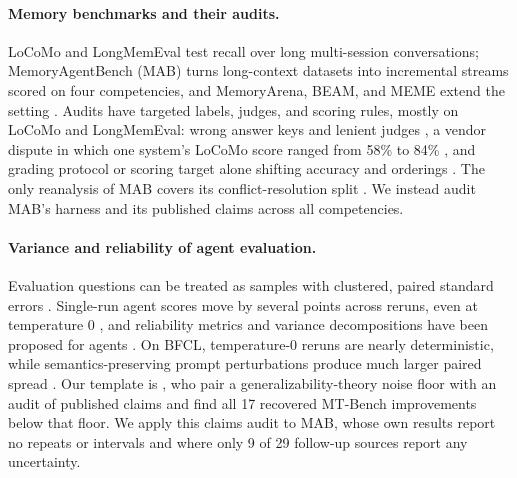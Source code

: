 \paragraph{Memory benchmarks and their audits.}
LoCoMo \citep{maharana2024locomo} and LongMemEval \citep{wu2025longmemeval} test recall over long multi-session conversations; MemoryAgentBench (MAB) \citep{hu2026memoryagentbench} turns long-context datasets into incremental streams scored on four competencies, and MemoryArena, BEAM, and MEME extend the setting \citep{he2026memoryarena,tavakoli2026beam,jung2026meme}. Audits have targeted labels, judges, and scoring rules, mostly on LoCoMo and LongMemEval: wrong answer keys and lenient judges \citep{penfield2026locomoaudit}, a vendor dispute in which one system's LoCoMo score ranged from 58\% to 84\% \citep{chhikara2025mem0,rasmussen2025zep,mem0zep2025issue}, and grading protocol or scoring target alone shifting accuracy and orderings \citep{yadav2026memstrata,panthi2026sameranking,chanhnourack2026auditing}. The only reanalysis of MAB covers its conflict-resolution split \citep{pakhomov2026bookkeeping}. We instead audit MAB's harness and its published claims across all competencies.

\paragraph{Variance and reliability of agent evaluation.}
Evaluation questions can be treated as samples with clustered, paired standard errors \citep{miller2024errorbars}. Single-run agent scores move by several points across reruns, even at temperature 0 \citep{bjarnason2026randomness}, and reliability metrics and variance decompositions have been proposed for agents \citep{mustahsan2025stochasticity,rabanser2026reliability,hardy2026agentreliability}. On BFCL, temperature-0 reruns are nearly deterministic, while semantics-preserving prompt perturbations produce much larger paired spread \citep{chen2026noisefloor}. Our template is \citet{anand2026askwhich}, who pair a generalizability-theory noise floor with an audit of published claims and find all 17 recovered MT-Bench improvements below that floor. We apply this claims audit to MAB, whose own results report no repeats or intervals and where only 9 of 29 follow-up sources report any uncertainty.

